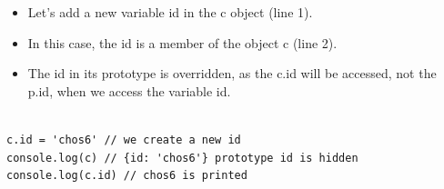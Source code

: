 \begin{frame}[fragile]{}

\begin{itemize}
	\item Let's add a new variable id in the c object (line 1). 
	\item In this case, the id is a member of the object c (line 2).
	\item The id in its prototype is overridden, as the c.id will be accessed, not the p.id, when we access the variable id. 
\end{itemize}

\begin{Code}{}%
\begin{lstlisting}[firstnumber=1, label=glabels, xleftmargin=0pt, basicstyle=\scriptsize]% 

c.id = 'chos6' // we create a new id
console.log(c) // {id: 'chos6'} prototype id is hidden
console.log(c.id) // chos6 is printed
\end{lstlisting}%
\end{Code}%

\end{frame}